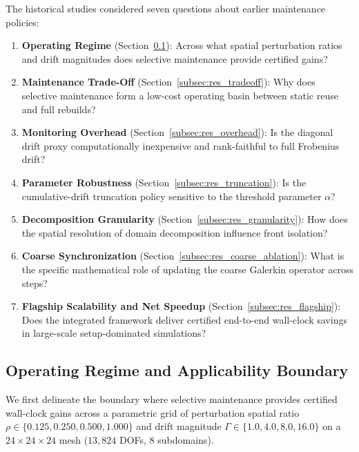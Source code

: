 \documentclass[preprint,12pt,3p]{elsarticle}
\begin{document}
The historical studies considered seven questions about earlier maintenance policies:
\begin{enumerate}
    \item \textbf{Operating Regime} (Section~\ref{subsec:res_regime}): Across what spatial perturbation ratios and drift magnitudes does selective maintenance provide certified gains?
    \item \textbf{Maintenance Trade-Off} (Section~\ref{subsec:res_tradeoff}): Why does selective maintenance form a low-cost operating basin between static reuse and full rebuilds?
    \item \textbf{Monitoring Overhead} (Section~\ref{subsec:res_overhead}): Is the diagonal drift proxy computationally inexpensive and rank-faithful to full Frobenius drift?
    \item \textbf{Parameter Robustness} (Section~\ref{subsec:res_truncation}): Is the cumulative-drift truncation policy sensitive to the threshold parameter $\alpha$?
    \item \textbf{Decomposition Granularity} (Section~\ref{subsec:res_granularity}): How does the spatial resolution of domain decomposition influence front isolation?
    \item \textbf{Coarse Synchronization} (Section~\ref{subsec:res_coarse_ablation}): What is the specific mathematical role of updating the coarse Galerkin operator across steps?
    \item \textbf{Flagship Scalability and Net Speedup} (Section~\ref{subsec:res_flagship}): Does the integrated framework deliver certified end-to-end wall-clock savings in large-scale setup-dominated simulations?
\end{enumerate}

\subsection{Operating Regime and Applicability Boundary}
\label{subsec:res_regime}
We first delineate the boundary where selective maintenance provides certified wall-clock gains across a parametric grid of perturbation spatial ratio $\rho \in \{0.125, 0.250, 0.500, 1.000\}$ and drift magnitude $\Gamma \in \{1.0, 4.0, 8.0, 16.0\}$ on a $24 \times 24 \times 24$ mesh ($13,824$ DOFs, 8 subdomains).
\end{document}
